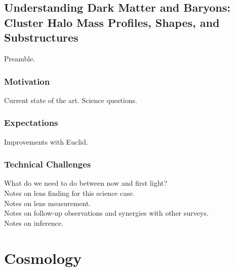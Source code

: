 \documentclass[twocolumn]{svjour3}
\begin{document}

\subsection{Understanding Dark Matter and Baryons: Cluster Halo Mass
Profiles, Shapes, and Substructures}



Preamble.

\subsubsection{Motivation}
Current state of the art. Science questions.\\

\subsubsection{Expectations}
Improvements with Euclid.\\

\subsubsection{Technical Challenges}

What do we need to do between now and first light?\\

Notes on lens finding for this science case.\\

Notes on lens measurement.\\

Notes on follow-up observations and synergies with other surveys.\\

Notes on inference.\\



\section{Cosmology}
\label{sec:cosmology}


\end{document}
